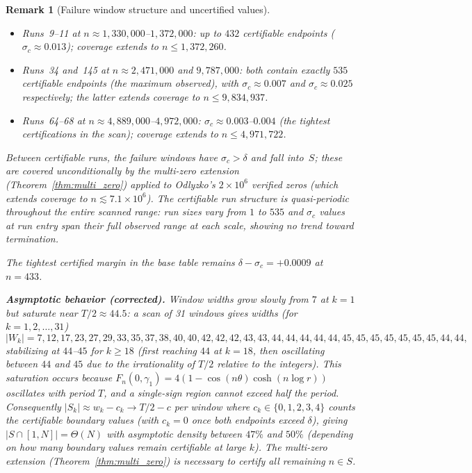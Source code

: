 \documentclass[11pt]{article}
\newtheorem{remark}[theorem]{Remark}
\begin{document}
\begin{remark}[Failure window structure and uncertified values]
\begin{itemize}
  coverage extends to $n \leq 998{,}543$.
\item Runs~9--11 at $n \approx 1{,}330{,}000$--$1{,}372{,}000$: up to $432$ certifiable endpoints
  ($\sigma_c \approx 0.013$); coverage extends to $n \leq 1{,}372{,}260$.
\item Runs~34 and~145 at $n \approx 2{,}471{,}000$ and $9{,}787{,}000$: both contain exactly $535$ certifiable
  endpoints (the maximum observed), with $\sigma_c \approx 0.007$ and $\sigma_c \approx 0.025$ respectively;
  the latter extends coverage to $n \leq 9{,}834{,}937$.
\item Runs~64--68 at $n \approx 4{,}889{,}000$--$4{,}972{,}000$: $\sigma_c \approx 0.003$--$0.004$
  (the tightest certifications in the scan); coverage extends to $n \leq 4{,}971{,}722$.
\end{itemize}
Between certifiable runs, the failure windows have $\sigma_c > \delta$ and fall into~$S$;
these are covered unconditionally by the multi-zero extension (Theorem~\ref{thm:multi_zero})
applied to Odlyzko's $2 \times 10^6$ verified zeros (which extends coverage to $n \lesssim 7.1 \times 10^6$).
The certifiable run structure is quasi-periodic throughout the entire scanned range:
run sizes vary from $1$ to $535$ and $\sigma_c$ values at run entry span their full observed
range at each scale, showing no trend toward termination.

The tightest certified margin in the base table remains $\delta - \sigma_c = +0.0009$ at $n=433$.

\textbf{Asymptotic behavior (corrected).}
Window widths grow slowly from $7$ at $k=1$ but \emph{saturate} near $T/2 \approx 44.5$:
a scan of 31 windows gives widths (for $k=1,2,\ldots,31$)
\[
|W_k| = 7, 12, 17, 23, 27, 29, 33, 35, 37, 38, 40, 40, 42, 42, 42, 43, 43,
        44, 44, 44, 44, 44, 45, 45, 45, 45, 45, 45, 45, 44, 44,
\]
stabilizing at $44$--$45$ for $k \geq 18$ (first reaching $44$ at $k=18$, then oscillating
between $44$ and $45$ due to the irrationality of $T/2$ relative to the integers).
This saturation occurs because $F_n(0,\gamma_1) = 4(1 - \cos(n\theta)\cosh(n\log r))$
oscillates with period $T$, and a single-sign region cannot exceed half the period.
Consequently $|S_k| \approx w_k - c_k \to T/2 - c$ per window where $c_k \in \{0,1,2,3,4\}$
counts the certifiable boundary values (with $c_k = 0$ once both endpoints exceed $\delta$),
giving $|S \cap [1,N]| = \Theta(N)$ with asymptotic density between $47\%$ and $50\%$
(depending on how many boundary values remain certifiable at large $k$).
The multi-zero extension (Theorem~\ref{thm:multi_zero}) is necessary to certify
all remaining $n \in S$.


\end{remark}
\end{document}
